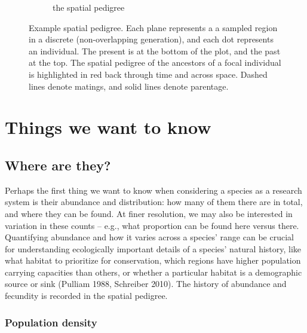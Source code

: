 \documentclass{ar-1col}
\newcommand{\todo}[1]{{\textbf{\color{red}{#1}}}}
\begin{document}
\begin{figure}[ht]
\begin{subfigure}{0.55\textwidth}
        \caption{the spatial pedigree}
        \label{sp_pedigree}
    \end{subfigure}
        \caption{
            Example spatial pedigree.
                    Each plane represents a a sampled region in a discrete (non-overlapping generation),
                    and each dot represents an individual.
                    The present is at the bottom of the plot, and the past at the top.
                    The spatial pedigree of the ancestors of a focal individual is highlighted in red
                    back through time and across space.
                    Dashed lines denote matings, and solid lines denote parentage.
        }
        \label{spatial_pedigree}
\end{figure}

\section{Things we want to know}

\subsection{Where are they?}

Perhaps the first thing we want to know
when considering a species as a research system
is their abundance and distribution:
how many of them there are in total, 
and where they can be found.
At finer resolution,
we may also be interested in variation in these counts --
e.g.,
what proportion can be found here versus there.
Quantifying abundance and how it varies across a species' range 
can be crucial for understanding
ecologically important details of a species' natural history,
like what habitat to prioritize for conservation, 
which regions have higher population carrying capacities than others, 
or whether a particular habitat is a demographic source or sink (Pulliam 1988, Schreiber 2010).
The history of abundance and fecundity is recorded in the spatial pedigree.

\subsubsection{Population density}

\todo{tidy up and tie together}
\end{document}
